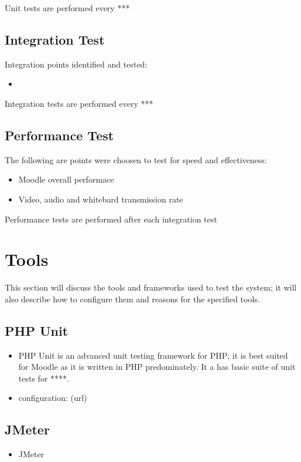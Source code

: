 \documentclass[12pt,a4paper]{article}
\begin{document}
		\newline 
		Unit tests are performed every ***
		
		\subsection*{Integration Test}
		Integration points identified and tested:
		\begin{itemize}
			\item
		\end{itemize}
		\newline
		Integration tests are performed every ***
		
		\newline
		\subsection*{Performance Test}
		The following are points were choosen to test for speed  and effectiveness:
		\begin{itemize}
			\item Moodle overall performace
			\item Video, audio and whitebard transmission rate 
		\end{itemize}
		\newline
		Performance tests are performed after each integration test
		
	\section*{Tools} %
		This section will discuss the tools and frameworks used to test the system; it will also describe how to configure them and reasons for the specified tools.
		\subsection{PHP Unit}
			\begin{itemize}
				\item PHP Unit is an advanced unit testing framework for PHP; it is best suited for Moodle as it is written in PHP predominately. It a has basic suite of unit tests for ****.
				\item configuration: (url)
			\end{itemize}
		\subsection{JMeter}
			\begin{itemize}
				\item JMeter
			\end{itemize}
	
				
		
\end{document}
